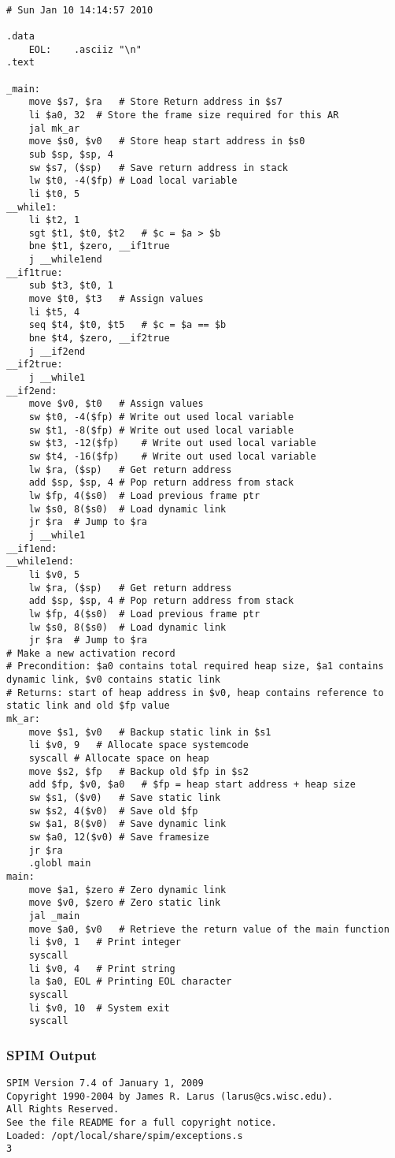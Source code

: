 \begin{lstlisting}[showstringspaces=false,breaklines=true,backgroundcolor=\color{light-gray}, captionpos=b]
         
# Sun Jan 10 14:14:57 2010

.data
	EOL:	.asciiz "\n"
.text

_main:
	move $s7, $ra	# Store Return address in $s7
	li $a0, 32	# Store the frame size required for this AR
	jal mk_ar
	move $s0, $v0	# Store heap start address in $s0
	sub $sp, $sp, 4
	sw $s7, ($sp)	# Save return address in stack
	lw $t0, -4($fp)	# Load local variable
	li $t0, 5
__while1:
	li $t2, 1
	sgt $t1, $t0, $t2	# $c = $a > $b
	bne $t1, $zero, __if1true
	j __while1end
__if1true:
	sub $t3, $t0, 1
	move $t0, $t3	# Assign values
	li $t5, 4
	seq $t4, $t0, $t5	# $c = $a == $b
	bne $t4, $zero, __if2true
	j __if2end
__if2true:
	j __while1
__if2end:
	move $v0, $t0	# Assign values
	sw $t0, -4($fp)	# Write out used local variable
	sw $t1, -8($fp)	# Write out used local variable
	sw $t3, -12($fp)	# Write out used local variable
	sw $t4, -16($fp)	# Write out used local variable
	lw $ra, ($sp)	# Get return address
	add $sp, $sp, 4	# Pop return address from stack
	lw $fp, 4($s0)	# Load previous frame ptr
	lw $s0, 8($s0)	# Load dynamic link
	jr $ra	# Jump to $ra
	j __while1
__if1end:
__while1end:
	li $v0, 5
	lw $ra, ($sp)	# Get return address
	add $sp, $sp, 4	# Pop return address from stack
	lw $fp, 4($s0)	# Load previous frame ptr
	lw $s0, 8($s0)	# Load dynamic link
	jr $ra	# Jump to $ra
# Make a new activation record
# Precondition: $a0 contains total required heap size, $a1 contains dynamic link, $v0 contains static link
# Returns: start of heap address in $v0, heap contains reference to static link and old $fp value
mk_ar:
	move $s1, $v0	# Backup static link in $s1
	li $v0, 9	# Allocate space systemcode
	syscall	# Allocate space on heap
	move $s2, $fp	# Backup old $fp in $s2
	add $fp, $v0, $a0	# $fp = heap start address + heap size
	sw $s1, ($v0)	# Save static link
	sw $s2, 4($v0)	# Save old $fp
	sw $a1, 8($v0)	# Save dynamic link
	sw $a0, 12($v0)	# Save framesize
	jr $ra
	.globl main
main:
	move $a1, $zero	# Zero dynamic link
	move $v0, $zero	# Zero static link
	jal _main
	move $a0, $v0	# Retrieve the return value of the main function
	li $v0, 1	# Print integer
	syscall
	li $v0, 4	# Print string
	la $a0, EOL	# Printing EOL character
	syscall
	li $v0, 10	# System exit
	syscall

\end{lstlisting}\subsubsection{SPIM Output}
\begin{verbatim}
SPIM Version 7.4 of January 1, 2009
Copyright 1990-2004 by James R. Larus (larus@cs.wisc.edu).
All Rights Reserved.
See the file README for a full copyright notice.
Loaded: /opt/local/share/spim/exceptions.s
3
\end{verbatim}

